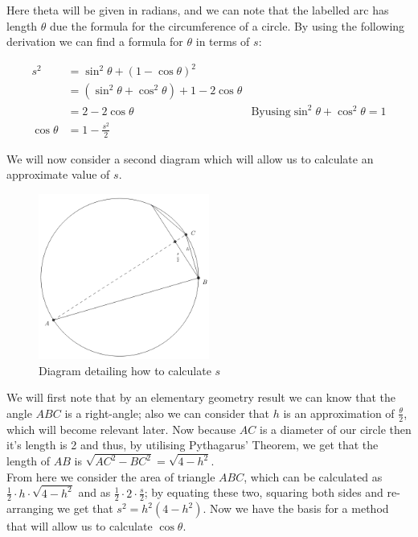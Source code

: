 Here theta will be given in radians, and we can note that the labelled arc has length \(\theta\) due the formula for the circumference of a circle. By using the following derivation we can find a formula for \(\theta\) in terms of \(s\):

\begin{displaymath}
\begin{align*}
	s^2 &= \sin^2\theta + (1 - \cos\theta)^2\\
	    &= (\sin^2\theta + \cos^2\theta) + 1 - 2\cos\theta\\
		&= 2 - 2 \cos\theta 
			&\mathrm{By using } \sin^2\theta + \cos^2\theta = 1\\
	\cos\theta &= 1 - \frac{s^2}{2}
\end{align*}
\end{displaymath}

We will now consider a second diagram which will allow us to calculate an approximate value of \(s\).

\begin{figure}[!ht]
	\label{FIG_"Geometric Trig 2"}
	\caption{Diagram detailing how to calculate \(s\)}
	\centering
	\includegraphics[width=0.5\textwidth]{"./Diagrams/Geometric Trig Diagram 2"}
\end{figure}

We will first note that by an elementary geometry result we can know that the angle \(ABC\) is a right-angle; also we can consider that \(h\) is an approximation of \(\tfrac{\theta}{2}\), which will become relevant later. Now because \(AC\) is a diameter of our circle then it's length is 2 and thus, by utilising Pythagarus' Theorem, we get that the length of \(AB\) is \(\sqrt{AC^2 - BC^2} = \sqrt{4 - h^2}\).\\

From here we consider the area of triangle \(ABC\), which can be calculated as \(\frac{1}{2}\cdot h\cdot\sqrt{4-h^2}\) and as \(\frac{1}{2}\cdot2\cdot\frac{s}{2}\); by equating these two, squaring both sides and re-arranging we get that \(s^2 = h^2(4 - h^2)\). Now we have the basis for a method that will allow us to calculate \(\cos\theta\).\\

